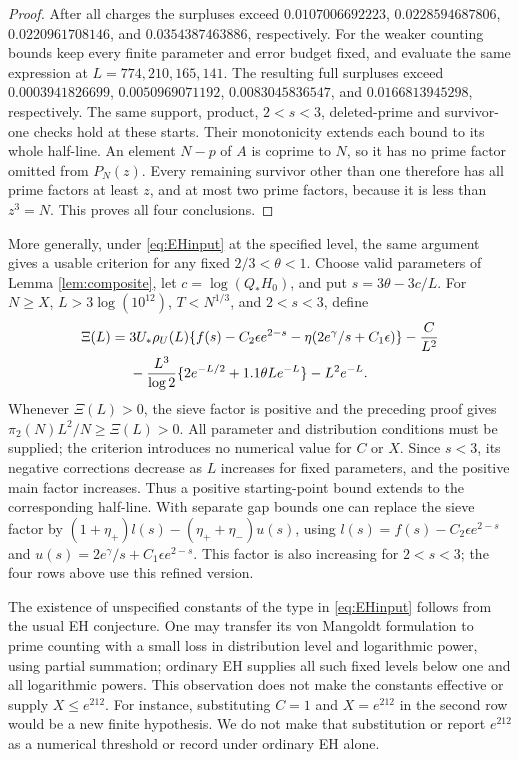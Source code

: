 \documentclass[11pt]{article}
\begin{document}
\begin{proof}
After all charges the surpluses exceed $0.0107006692223$,
$0.0228594687806$, $0.0220961708146$, and $0.0354387463886$,
respectively.
For the weaker counting bounds keep every finite parameter and error
budget fixed, and evaluate the same expression at $L=774,210,165,141$.
The resulting full surpluses exceed $0.0003941826699$,
$0.0050969071192$, $0.0083045836547$, and $0.0166813945298$,
respectively. The same support, product, $2<s<3$, deleted-prime and
survivor-one checks hold at these starts. Their monotonicity extends
each bound to its whole half-line.
An element $N-p$ of $A$ is coprime to $N$, so it has no prime factor
omitted from $P_N(z)$. Every remaining survivor other than one therefore
has all prime factors at least $z$, and at most two prime factors,
because it is less than $z^3=N$. This proves all four conclusions.
\end{proof}

More generally, under \eqref{eq:EHinput} at the specified level,
the same argument gives a usable criterion for any fixed $2/3<\theta<1$.
Choose valid parameters of Lemma
\ref{lem:composite}, let $c=\log(Q_*H_0)$, and put
$s=3\theta-3c/L$. For $N\ge X$, $L>3\log(10^{12})$,
$T<N^{1/3}$, and $2<s<3$, define
\begin{align}\label{eq:generaldistribution}
\Xi(L)={}&3U_*\rho_U(L)
\{f(s)-C_2\epsilon e^{2-s}-\eta(2e^\gamma/s+C_1\epsilon)\}
-\frac{C}{L^2}\notag\\
&-\frac{L^3}{\log2}\{2e^{-L/2}+1.1\theta Le^{-L}\}
-L^2e^{-L}.
\end{align}
Whenever $\Xi(L)>0$, the sieve factor is positive and the preceding
proof gives $\pi_2(N)L^2/N\ge\Xi(L)>0$. All parameter and distribution
conditions must be supplied; the criterion introduces no numerical
value for $C$ or $X$. Since $s<3$, its negative corrections decrease
as $L$ increases for fixed parameters, and the positive main factor
increases. Thus a positive starting-point bound extends to the
corresponding half-line. With separate gap bounds one can replace the
sieve factor by $(1+\eta_+)l(s)-(\eta_++\eta_-)u(s)$, using
$l(s)=f(s)-C_2\epsilon e^{2-s}$ and
$u(s)=2e^\gamma/s+C_1\epsilon e^{2-s}$.
This factor is also increasing for $2<s<3$; the four rows above use
this refined version.

The existence of unspecified constants of the type in
\eqref{eq:EHinput} follows from the usual EH conjecture.
One may transfer its von Mangoldt formulation to prime counting with
a small loss in distribution level and logarithmic power, using partial
summation; ordinary EH supplies all such fixed levels below one and
all logarithmic powers. This observation does not make the constants
effective or supply $X\le e^{212}$. For instance, substituting $C=1$
and $X=e^{212}$ in the second row would be a new finite hypothesis.
We do not make that substitution or report $e^{212}$ as a numerical
threshold or record under ordinary EH alone.
\end{document}

